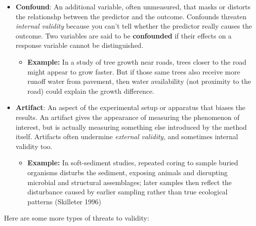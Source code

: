 \documentclass[
  letterpaper,
  DIV=11,
  numbers=noendperiod]{scrreprt}
\providecommand{\tightlist}{%
  \setlength{\itemsep}{0pt}\setlength{\parskip}{0pt}}\usepackage{longtable,booktabs,array}
\begin{document}
\begin{itemize}
\item
  \textbf{Confound}: An additional variable, often unmeasured, that
  masks or distorts the relationshp between the predictor and the
  outcome. Confounds threaten \emph{internal validity} because you can't
  tell whether the predictor really causes the outcome. Two variables
  are said to be \textbf{confounded} if their effects on a response
  variable cannot be distinguished.

  \begin{itemize}
  \tightlist
  \item
    \textbf{Example:} In a study of tree growth near roads, trees closer
    to the road might appear to grow faster. But if those same trees
    also receive more runoff water from pavement, then water
    availability (not proximity to the road) could explain the growth
    difference.
  \end{itemize}
\item
  \textbf{Artifact}: An aspect of the experimental setup or apparatus
  that biases the results. An artifact gives the appearance of measuring
  the phenomenon of interest, but is actually measuring something else
  introduced by the method itself. Artifacts often undermine
  \emph{external validity,} and sometimes internal validity too.

  \begin{itemize}
  \tightlist
  \item
    \textbf{Example:} In soft-sediment studies, repeated coring to
    sample buried organisms disturbs the sediment, exposing animals and
    disrupting microbial and structural assemblages; later samples then
    reflect the disturbance caused by earlier sampling rather than true
    ecological patterns (Skilleter 1996)
  \end{itemize}
\end{itemize}

Here are some more types of threats to validity:
\end{document}
